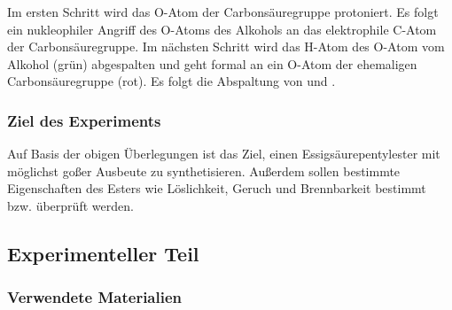 \documentclass{article}
\begin{document}
        Im ersten Schritt wird das O-Atom der Carbonsäuregruppe protoniert. Es folgt ein nukleophiler Angriff des O-Atoms des Alkohols an das elektrophile C-Atom der Carbonsäuregruppe. Im nächsten Schritt wird das H-Atom des O-Atom vom Alkohol (grün) abgespalten und geht formal an ein O-Atom der ehemaligen Carbonsäuregruppe (rot). Es folgt die Abspaltung von  und . 
        
      \subsubsection{Ziel des Experiments}
    
        Auf Basis der obigen Überlegungen ist das Ziel, einen Essigsäurepentylester mit möglichst goßer Ausbeute zu synthetisieren. Außerdem sollen bestimmte Eigenschaften des Esters wie Löslichkeit, Geruch und Brennbarkeit bestimmt bzw. überprüft werden. 
    
    \subsection{Experimenteller Teil}
  
      \subsubsection{Verwendete Materialien}
              
\end{document}
